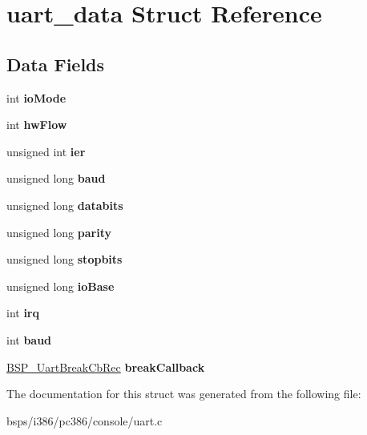 \hypertarget{structuart__data}{}\section{uart\+\_\+data Struct Reference}
\label{structuart__data}
\subsection*{Data Fields}
\begin{DoxyCompactItemize}
\item 
\mbox{\label{structuart__data_a58b81318a5aa7d8a553d8678cbff71b7}} 
int {\bfseries io\+Mode}
\item 
\mbox{\label{structuart__data_abc808e709ba3475a27b088c30f9051cb}} 
int {\bfseries hw\+Flow}
\item 
\mbox{\label{structuart__data_a28c47cc05cbbe75298e47ccbaa6492fc}} 
unsigned int {\bfseries ier}
\item 
\mbox{\label{structuart__data_af0683e812100c6912173d16eb021b18f}} 
unsigned long {\bfseries baud}
\item 
\mbox{\label{structuart__data_a0233f7fe2649041b6f4b396e8b03b08f}} 
unsigned long {\bfseries databits}
\item 
\mbox{\label{structuart__data_a5f63deafd2fc52debf5b9c00183dcf07}} 
unsigned long {\bfseries parity}
\item 
\mbox{\label{structuart__data_a5fd5661faac377555eb3b435c72d9aa1}} 
unsigned long {\bfseries stopbits}
\item 
\mbox{\label{structuart__data_a47471b4a0587fb90ccc95ea5965027d0}} 
unsigned long {\bfseries io\+Base}
\item 
\mbox{\label{structuart__data_aed96aae3b6f4476c6553c910154b748d}} 
int {\bfseries irq}
\item 
\mbox{\label{structuart__data_ab400bb4c39c39e3843dd6b6fc72d43c4}} 
int {\bfseries baud}
\item 
\mbox{\label{structuart__data_a1f4e0ce7ec89caa5c34e67d20c25b3bb}} 
\mbox{\hyperlink{structBSP__UartBreakCbRec__}{B\+S\+P\+\_\+\+Uart\+Break\+Cb\+Rec}} {\bfseries break\+Callback}
\end{DoxyCompactItemize}


The documentation for this struct was generated from the following file\+:\begin{DoxyCompactItemize}
\item 
bsps/i386/pc386/console/uart.\+c\end{DoxyCompactItemize}
